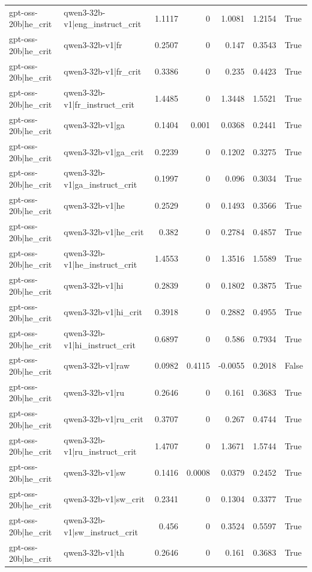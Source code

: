 \begin{table}
\begin{tabular}{l l r r r r l}
gpt-oss-20b|he_crit & qwen3-32b-v1|eng_instruct_crit & 1.1117 & 0 & 1.0081 & 1.2154 & True \\
gpt-oss-20b|he_crit & qwen3-32b-v1|fr & 0.2507 & 0 & 0.147 & 0.3543 & True \\
gpt-oss-20b|he_crit & qwen3-32b-v1|fr_crit & 0.3386 & 0 & 0.235 & 0.4423 & True \\
gpt-oss-20b|he_crit & qwen3-32b-v1|fr_instruct_crit & 1.4485 & 0 & 1.3448 & 1.5521 & True \\
gpt-oss-20b|he_crit & qwen3-32b-v1|ga & 0.1404 & 0.001 & 0.0368 & 0.2441 & True \\
gpt-oss-20b|he_crit & qwen3-32b-v1|ga_crit & 0.2239 & 0 & 0.1202 & 0.3275 & True \\
gpt-oss-20b|he_crit & qwen3-32b-v1|ga_instruct_crit & 0.1997 & 0 & 0.096 & 0.3034 & True \\
gpt-oss-20b|he_crit & qwen3-32b-v1|he & 0.2529 & 0 & 0.1493 & 0.3566 & True \\
gpt-oss-20b|he_crit & qwen3-32b-v1|he_crit & 0.382 & 0 & 0.2784 & 0.4857 & True \\
gpt-oss-20b|he_crit & qwen3-32b-v1|he_instruct_crit & 1.4553 & 0 & 1.3516 & 1.5589 & True \\
gpt-oss-20b|he_crit & qwen3-32b-v1|hi & 0.2839 & 0 & 0.1802 & 0.3875 & True \\
gpt-oss-20b|he_crit & qwen3-32b-v1|hi_crit & 0.3918 & 0 & 0.2882 & 0.4955 & True \\
gpt-oss-20b|he_crit & qwen3-32b-v1|hi_instruct_crit & 0.6897 & 0 & 0.586 & 0.7934 & True \\
gpt-oss-20b|he_crit & qwen3-32b-v1|raw & 0.0982 & 0.4115 & -0.0055 & 0.2018 & False \\
gpt-oss-20b|he_crit & qwen3-32b-v1|ru & 0.2646 & 0 & 0.161 & 0.3683 & True \\
gpt-oss-20b|he_crit & qwen3-32b-v1|ru_crit & 0.3707 & 0 & 0.267 & 0.4744 & True \\
gpt-oss-20b|he_crit & qwen3-32b-v1|ru_instruct_crit & 1.4707 & 0 & 1.3671 & 1.5744 & True \\
gpt-oss-20b|he_crit & qwen3-32b-v1|sw & 0.1416 & 0.0008 & 0.0379 & 0.2452 & True \\
gpt-oss-20b|he_crit & qwen3-32b-v1|sw_crit & 0.2341 & 0 & 0.1304 & 0.3377 & True \\
gpt-oss-20b|he_crit & qwen3-32b-v1|sw_instruct_crit & 0.456 & 0 & 0.3524 & 0.5597 & True \\
gpt-oss-20b|he_crit & qwen3-32b-v1|th & 0.2646 & 0 & 0.161 & 0.3683 & True \\

\end{tabular}
\end{table}
